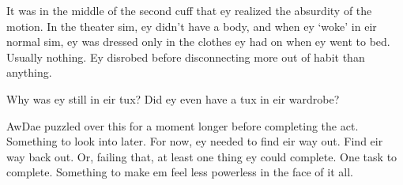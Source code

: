 It was in the middle of the second cuff that ey realized the absurdity of the motion. In the theater sim, ey didn't have a body, and when ey `woke' in eir normal sim, ey was dressed only in the clothes ey had on when ey went to bed. Usually nothing. Ey disrobed before disconnecting more out of habit than anything.

Why was ey still in eir tux? Did ey even have a tux in eir wardrobe?

AwDae puzzled over this for a moment longer before completing the act. Something to look into later. For now, ey needed to find eir way out. Find eir way back out. Or, failing that, at least one thing ey could complete. One task to complete. Something to make em feel less powerless in the face of it all.
